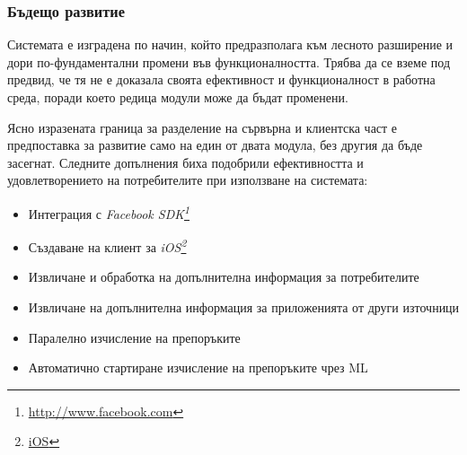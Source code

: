 \subsubsection{Бъдещо развитие}

	Системата е изградена по начин, който предразполага към лесното разширение и дори по-фундаментални промени във функционалността.
	Трябва да се вземе под предвид, че тя не е доказала своята ефективност и функционалност в работна среда, поради което редица модули може да бъдат променени.
	
	Ясно изразената граница за разделение на сървърна и клиентска част е предпоставка за развитие само на един от двата модула, без другия да бъде засегнат. Следните допълнения биха подобрили ефективността и удовлетворението на потребителите при използване на системата:
	
	\begin{itemize}
		\item Интеграция с \emph{Facebook SDK\footnote{\url{http://www.facebook.com}}}
		\item Създаване на клиент за \emph{iOS\footnote{\url{iOS}}}
		\item Извличане и обработка на допълнителна информация за потребителите
		\item Извличане на допълнителна информация за приложенията от други източници
		\item Паралелно изчисление на препоръките
		\item Автоматично стартиране изчисление на препоръките чрез \ac{ML}
	\end{itemize}
